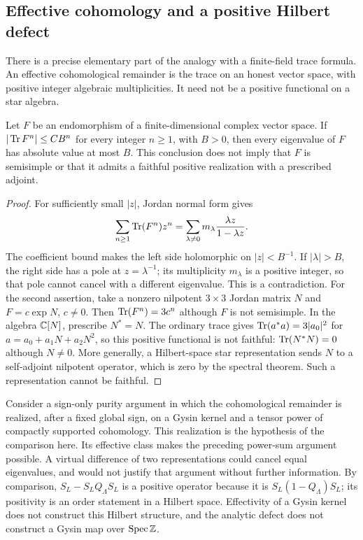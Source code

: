 \subsection{Effective cohomology and a positive Hilbert defect}
There is a precise elementary part of the analogy with a finite-field
trace formula. An effective cohomological remainder is the trace on
an honest vector space, with positive integer algebraic multiplicities.
It need not be a positive functional on a star algebra.

\begin{proposition}
\label{prop:effective-power-traces}
Let $F$ be an endomorphism of a finite-dimensional complex vector
space. If $|\operatorname{Tr} F^n|\leq CB^n$ for every integer $n\geq1$, with
$B>0$, then every eigenvalue of $F$ has absolute value at most $B$.
This conclusion does not imply that $F$ is semisimple or that it
admits a faithful positive realization with a prescribed adjoint.
\end{proposition}
\begin{proof}
For sufficiently small $|z|$, Jordan normal form gives
\[
 \sum_{n\geq1}\operatorname{Tr}(F^n)z^n
     =\sum_{\lambda\ne0}m_\lambda\frac{\lambda z}{1-\lambda z}.
\]
The coefficient bound makes the left side holomorphic on
$|z|<B^{-1}$. If $|\lambda|>B$, the right side has a pole at
$z=\lambda^{-1}$; its multiplicity $m_\lambda$ is a positive integer,
so that pole cannot cancel with a different eigenvalue. This is a
contradiction. For the second assertion, take a nonzero nilpotent
$3\times3$ Jordan matrix $N$ and $F=c\exp N$, $c\ne0$.
Then $\operatorname{Tr}(F^n)=3c^n$ although $F$ is not semisimple. In the algebra
$\mathbb C[N]$, prescribe $N^*=N$. The ordinary trace gives
$\operatorname{Tr}(a^*a)=3|a_0|^2$ for $a=a_0+a_1N+a_2N^2$, so this positive
functional is not faithful: $\operatorname{Tr}(N^*N)=0$ although $N\ne0$.
More generally, a Hilbert-space star representation sends $N$ to
a self-adjoint nilpotent operator, which is zero by the spectral
theorem. Such a representation cannot be faithful.
\end{proof}

Consider a sign-only purity argument in which the cohomological
remainder is realized, after a fixed global sign, on a Gysin kernel
and a tensor power of compactly supported cohomology. This realization
is the hypothesis of the comparison here. Its effective class makes
the preceding power-sum argument possible. A virtual difference of
two representations could cancel equal eigenvalues, and would not
justify that argument without further information. By comparison,
$S_L-S_LQ_\Lambda S_L$ is a positive operator because it is
$S_L(1-Q_\Lambda)S_L$; its positivity is an order statement in a
Hilbert space. Effectivity of a Gysin kernel does not construct this
Hilbert structure, and the analytic defect does not construct a
Gysin map over $\operatorname{Spec}\mathbb Z$.

